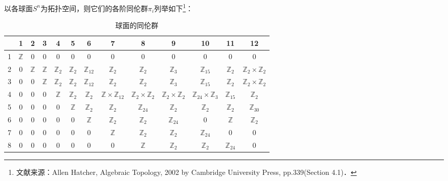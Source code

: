 

以各球面$S^n$为拓扑空间，则它们的各阶同伦群$\pi_i$列举如下\footnote{文献来源：Allen Hatcher, Algebraic Topology, 2002 by Cambridge University Press, pp.339(Section 4.1)．}：

\begin{table}[ht]
\centering
\caption{球面的同伦群}\label{SphHmt_tab1}
\begin{tabular}{|c|c|c|c|c|c|c|c|c|c|c|c|c|}
\hline
 & 1 & 2 & 3 & 4 & 5 & 6 & 7 & 8 & 9 & 10 & 11 & 12 \\
\hline
1 & $\mathbb{Z}$ & 0 & 0 & 0 & 0 & 0 & 0 & 0 & 0 & 0 & 0 & 0 \\
\hline
2 & 0 & $\mathbb{Z}$ & $\mathbb{Z}$ & $\mathbb{Z}_2$ & $\mathbb{Z}_2$ & $\mathbb{Z}_{12}$ & $\mathbb{Z}_2$ & $\mathbb{Z}_2$ & $\mathbb{Z}_3$ & $\mathbb{Z}_{15}$ & $\mathbb{Z}_2$ & $\mathbb{Z}_2\times\mathbb{Z}_2$\\
\hline
3 & 0 & 0 & $\mathbb{Z}$ & $\mathbb{Z}_2$ & $\mathbb{Z}_2$ & $\mathbb{Z}_{12}$ & $\mathbb{Z}_2$ & $\mathbb{Z}_2$ & $\mathbb{Z}_3$ & $\mathbb{Z}_{15}$ & $\mathbb{Z}_2$ & $\mathbb{Z}_2\times\mathbb{Z}_2$ \\
\hline
4 & 0 & 0 & 0 & $\mathbb{Z}$ & $\mathbb{Z}_2$ & $\mathbb{Z}_2$ & $\mathbb{Z}\times\mathbb{Z}_{12}$ & $\mathbb{Z}_2\times\mathbb{Z}_2$ & $\mathbb{Z}_2\times\mathbb{Z}_2$ & $\mathbb{Z}_{24}\times\mathbb{Z}_3$ & $\mathbb{Z}_{15}$ & $\mathbb{Z}_2$ \\
\hline
5 & 0 & 0 & 0 & 0 & $\mathbb{Z}$ & $\mathbb{Z}_2$ & $\mathbb{Z}_2$ & $\mathbb{Z}_{24}$ & $\mathbb{Z}_2$ & $\mathbb{Z}_2$ & $\mathbb{Z}_2$ & $\mathbb{Z}_{30}$ \\
\hline
6 & 0 & 0 & 0 & 0 & 0 & $\mathbb{Z}$ & $\mathbb{Z}_2$ & $\mathbb{Z}_2$ & $\mathbb{Z}_{24}$ & 0 & $\mathbb{Z}$ & $\mathbb{Z}_2$ \\
\hline
7 & 0 & 0 & 0 & 0 & 0 & 0 & $\mathbb{Z}$ & $\mathbb{Z}_2$ & $\mathbb{Z}_2$ & $\mathbb{Z}_{24}$ & 0 & 0 \\
\hline
8 & 0 & 0 & 0 & 0 & 0 & 0 & 0 & $\mathbb{Z}$ & $\mathbb{Z}_2$ & $\mathbb{Z}_2$ & $\mathbb{Z}_{24}$ & 0 \\
\hline
\end{tabular}
\end{table}